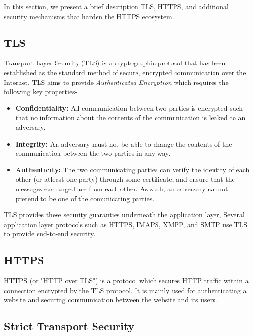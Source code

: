 In this section, we present a brief description TLS, HTTPS, and additional security
mechanisms that harden the HTTPS ecosystem.

\subsection{TLS}
Transport Layer Security (TLS) is a cryptographic protocol that has been
established as the standard method of secure, encrypted communication over the
Internet. TLS aims to provide \emph{Authenticated Encryption} which requires the
following key properties-
\begin{itemize}
  \item \textbf{Confidentiality:} All communication between two parties is
  encrypted such that no information about the contents of the communication is
  leaked to an adversary.

  \item \textbf{Integrity:} An adversary must not be able to change the
  contents of the communication between the two parties in any way.

  \item \textbf{Authenticity:} The two communicating parties can verify the
  identity of each other (or atleast one party) through some certificate, and
  ensure that the messages exchanged are from each other. As such, an adversary
  cannot pretend to be one of the comunicating parties.
\end{itemize}

TLS provides these security guaranties underneath the application layer,
Several application layer protocols such as HTTPS, IMAPS, XMPP, and SMTP use TLS
to provide end-to-end security.

\subsection{HTTPS}
HTTPS (or "HTTP over TLS") is a protocol which secures HTTP traffic within a
connection encrypted by the TLS protocol. It is mainly used for authenticating
a website and securing communication between the website and its users.

\subsection{Strict Transport Security}

